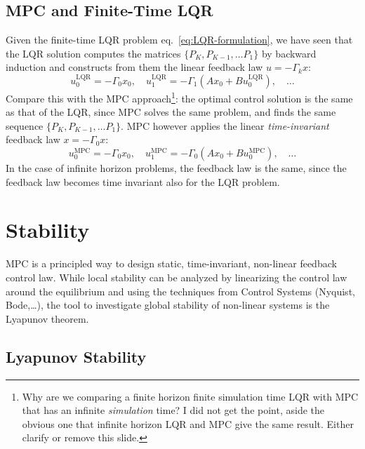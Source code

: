 \subsection{MPC and Finite-Time LQR}
\label{sec:MPC-finite-time-LQR}

Given the finite-time LQR problem eq.~\eqref{eq:LQR-formulation}, we have seen that the LQR solution computes the matrices $\{P_K, P_{K-1},\ldots P_1\}$ by backward induction and constructs from them the linear feedback law $u=-\Gamma_kx$:
\begin{equation*}
  u_0^\textrm{LQR} = -\Gamma_0x_0, \quad u_1^\textrm{LQR} = -\Gamma_1\left(Ax_0+Bu_0^\textrm{LQR}\right), \quad \ldots
\end{equation*}
Compare this with the MPC approach\footnote{Why are we comparing a finite horizon finite simulation time LQR with MPC that has an infinite \emph{simulation} time? I did not get the point, aside the obvious one that infinite horizon LQR and MPC give the same result. Either clarify or remove this slide.}: the optimal control solution is the same as that of the LQR, since MPC solves the same problem, and finds the same sequence $\{P_K, P_{K-1},\ldots P_1\}$. MPC however applies the linear \emph{time-invariant} feedback law $x=-\Gamma_0x$:
\begin{equation*}
  u_0^\textrm{MPC} = -\Gamma_0x_0, \quad u_1^\textrm{MPC} = -\Gamma_0\left(Ax_0+Bu_0^\textrm{MPC}\right), \quad \ldots
\end{equation*}
In the case of infinite horizon problems, the feedback law is the same, since the feedback law becomes time invariant also for the LQR problem.

\section{Stability}
\label{sec:mpc-stability}

MPC is a principled way to design static, time-invariant, non-linear feedback control law. While local stability can be analyzed by linearizing the control law around the equilibrium and using the techniques from Control Systems (Nyquist, Bode,\ldots), the tool to investigate global stability of non-linear systems is the Lyapunov theorem.

\subsection{Lyapunov Stability}
\label{sec:lyapunov-stability}

